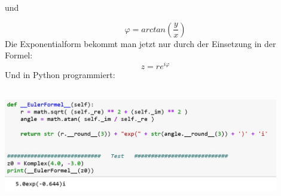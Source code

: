 \documentclass[12pt,oneside,a4paper]{article}
\begin{document}
\begin{flushleft}
\begin{center} 
und
\end{center} $$\varphi = arctan(\frac{y}{x})$$
Die Exponentialform bekommt man jetzt nur durch der Einsetzung in der Formel: 
$$z = re ^{i\varphi}$$  Und in Python programmiert:
\bigskip
\begin{center}
\includegraphics[width=12cm,height=5cm]{Exp}
\end{center}
\end{flushleft}
\end{document}
